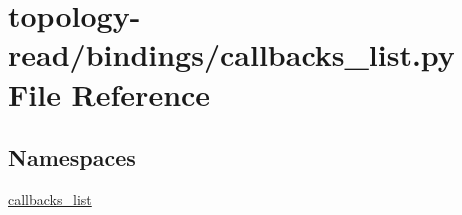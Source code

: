 \hypertarget{topology-read_2bindings_2callbacks__list_8py}{}\section{topology-\/read/bindings/callbacks\+\_\+list.py File Reference}
\label{topology-read_2bindings_2callbacks__list_8py}
\subsection*{Namespaces}
\begin{DoxyCompactItemize}
\item 
 \hyperlink{namespacecallbacks__list}{callbacks\+\_\+list}
\end{DoxyCompactItemize}
